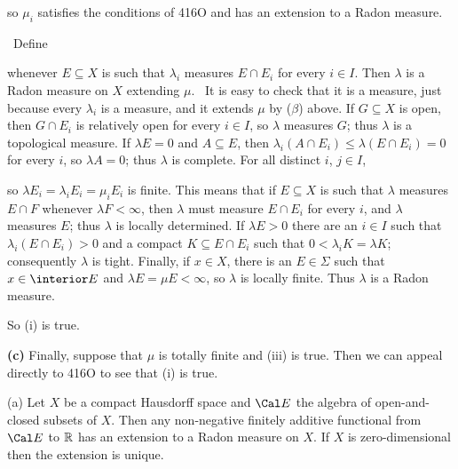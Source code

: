 {

\noindent so $\mu_i$ satisfies the conditions of 416O and has an
extension to a Radon measure.\ \Qed

\medskip

\quad\grheadd\ Define


\noindent whenever $E\subseteq X$ is such that $\lambda_i$ measures
$E\cap E_i$ for every $i\in I$.   Then $\lambda$ is a Radon measure on
$X$ extending $\mu$.   \Prf\ It is easy to check that it is a measure,
just because every $\lambda_i$ is a measure, and it extends $\mu$ by
($\beta$) above.   If $G\subseteq X$ is open, then $G\cap E_i$ is
relatively open for every $i\in I$, so $\lambda$ measures $G$;  thus
$\lambda$ is a topological measure.   If $\lambda E=0$ and
$A\subseteq E$, then
$\lambda_i(A\cap E_i)\le\lambda(E\cap E_i)=0$ for every $i$, so
$\lambda A=0$;  thus $\lambda$ is complete.   For all distinct $i$,
$j\in I$,


\noindent so $\lambda E_i=\lambda_iE_i=\mu_iE_i$ is finite.   This means
that if $E\subseteq X$ is such that $\lambda$ measures $E\cap F$
whenever
$\lambda F<\infty$, then $\lambda$ must measure $E\cap E_i$ for every
$i$, and $\lambda$ measures $E$;  thus $\lambda$ is locally determined.
If $\lambda E>0$ there are an $i\in I$ such that $\lambda_i(E\cap
E_i)>0$ and a compact $K\subseteq E\cap E_i$ such that
$0<\lambda_iK=\lambda K$;  consequently $\lambda$ is tight.   Finally, if
$x\in X$, there is an $E\in\Sigma$ such that $x\in\interior E$ and
$\lambda E=\mu E<\infty$, so $\lambda$ is locally finite.   Thus
$\lambda$ is a Radon measure.\ \Qed

So (i) is true.

\medskip

{\bf (c)} Finally, suppose that $\mu$ is totally finite and (iii) is
true.   Then we can appeal directly to 416O to see that (i) is true.
}%

 (a) Let $X$ be a compact Hausdorff space and
$\Cal E$ the algebra of open-and-closed subsets of $X$.   Then any
non-negative finitely additive functional from $\Cal E$ to $\Bbb R$ has
an extension to a Radon measure on $X$.   If $X$ is zero-dimensional
then the extension is unique.

